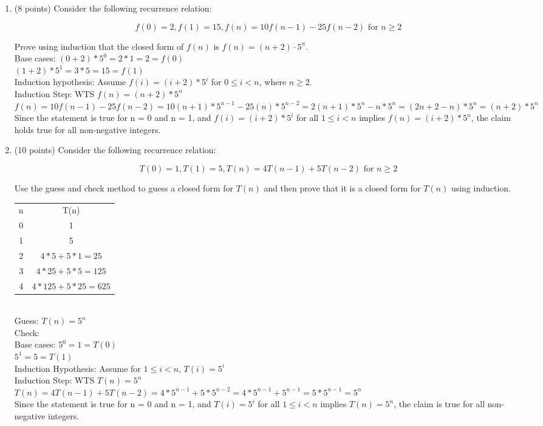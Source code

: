 \documentclass[10pt,letterpaper,unboxed,cm]{article}
\begin{document}
\begin{enumerate}
\begin{enumerate}
    \end{enumerate}

    \item (8 points) Consider the following recurrence relation:

    \[f(0) = 2, f(1) = 15, f(n) = 10f(n-1) - 25f(n-2) \textrm{ for } n \geq 2\]

    Prove using induction that the closed form of $f(n)$ is $f(n) = (n+2)\cdot5^n$.\\
    
    Base cases: $(0 + 2)*5^0 = 2 *1 = 2 = f(0)$\\ $(1+2)*5^1 = 3*5 = 15 = f(1)$ \\
    Induction hypothesis: Assume $f(i) = (i+2)*5^i$ for $0 \leq i < n$, where $n \geq 2$.\\
    Induction Step: WTS $f(n) = (n + 2)*5^n$\\
    $f(n) = 10f(n-1) - 25f(n-2) = 10(n + 1)*5^{n-1} - 25(n)*5^{n-2} = 2(n + 1)*5^n - n*5^n = (2n + 2 - n)*5^n = (n + 2)*5^n$ \\
    Since the statement is true for n = 0 and n = 1, and $f(i) = (i+2)*5^i$ for all $1 \leq i < n$ implies $f(n) = (i+2)*5^n$, the claim holds true for all non-negative integers.

    \item (10 points) Consider the following recurrence relation:

    \[T(0) = 1, T(1) = 5, T(n) = 4T(n-1) + 5T(n-2)\textrm{ for } n \geq 2\]

    Use the guess and check method to guess a closed form for $T(n)$ and then prove that it is a closed form for $T(n)$ using induction.\\
    \begin{table}[h]
    \begin{tabular}{|c|c|}
    n & T(n)\\
    0&1\\
    1 &5\\
    2 & $4*5+5*1 = 25$   \\
    3 & $4*25 + 5*5 = 125$\\
    4&$4*125 + 5*25 = 625$
    \end{tabular}
    \end{table}\\
    Guess: $T(n) = 5^n$\\
    Check:\\
    Base cases: $5^0 = 1 = T(0)$\\$5^1 = 5 = T(1)$\\
    Induction Hypothesis: Assume for $1 \leq i < n$, $T(i) = 5^i$\\
    Induction Step: WTS $T(n) = 5^n$\\
    $T(n) = 4T(n-1)+5T(n-2) = 4*5^{n-1} + 5*5^{n-2} = 4*5^{n-1} + 5^{n-1} = 5*5^{n-1} = 5^n$\\
    Since the statement is true for n = 0 and n = 1, and $T(i) = 5^i$ for all $1 \leq i < n$ implies $T(n) = 5^n$, the claim is true for all non-negative integers.\\



\end{enumerate}
\end{document}
